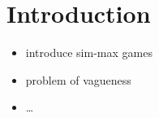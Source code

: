 \section{Introduction}

\begin{itemize}
\item introduce sim-max games
\item problem of vagueness \citep{Lipman2009:Why-is-Language}
\item \dots
\end{itemize}




